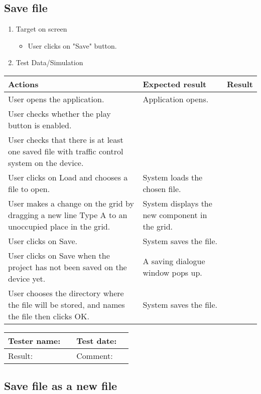 \newpage
\subsection{Save file}

\begin{enumerate}
	
	\item Target on screen
	\begin{itemize}
		\item User clicks on "Save" button.
	\end{itemize}
	\item Test Data/Simulation
\end{enumerate}
	\begin{tabularx}{\textwidth}{|X|X|p{2.5cm}|}\hline
		Actions & Expected result & Result \\\hline
		User opens the application.& Application opens. &  \pass \\\hline
		User checks whether the play button is enabled. & &  \pass \\\hline
		User checks that there is at least one saved file with traffic control system on the device.& &\pass \\\hline
		User clicks on Load and chooses a file to open. & System loads the chosen file.  & \pass \\\hline 
		User makes a change on the grid by dragging a new line Type A to an unoccupied place in the grid. & System displays the new component in the grid. & \pass \\\hline 
		User clicks on Save. & System saves the file.  & \pass \\\hline 
		User clicks on Save when the project has not been saved on the device yet. & A saving dialogue window pops up. & \pass \\\hline
		User chooses the directory where the file will be stored, and names the file then clicks OK. & System saves the file. & \pass \\\hline 
	\end{tabularx}

\begin{tabularx}{\textwidth}{|p{3cm}X|p{3cm}X|}\hline
	Tester name: &  & Test date: & \\\hline
	Result: &  \pass & Comment: & \\\hline
\end{tabularx}

\newpage
\subsection{Save file as a new file}

